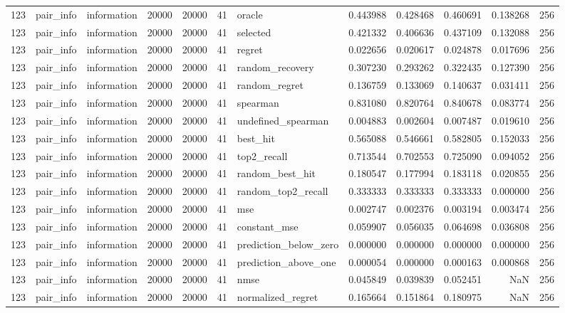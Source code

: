 \begin{tabular}{rllrrrlrrrrr}
123 & pair_info & information & 20000 & 20000 & 41 & oracle & 0.443988 & 0.428468 & 0.460691 & 0.138268 & 256 \\
123 & pair_info & information & 20000 & 20000 & 41 & selected & 0.421332 & 0.406636 & 0.437109 & 0.132088 & 256 \\
123 & pair_info & information & 20000 & 20000 & 41 & regret & 0.022656 & 0.020617 & 0.024878 & 0.017696 & 256 \\
123 & pair_info & information & 20000 & 20000 & 41 & random_recovery & 0.307230 & 0.293262 & 0.322435 & 0.127390 & 256 \\
123 & pair_info & information & 20000 & 20000 & 41 & random_regret & 0.136759 & 0.133069 & 0.140637 & 0.031411 & 256 \\
123 & pair_info & information & 20000 & 20000 & 41 & spearman & 0.831080 & 0.820764 & 0.840678 & 0.083774 & 256 \\
123 & pair_info & information & 20000 & 20000 & 41 & undefined_spearman & 0.004883 & 0.002604 & 0.007487 & 0.019610 & 256 \\
123 & pair_info & information & 20000 & 20000 & 41 & best_hit & 0.565088 & 0.546661 & 0.582805 & 0.152033 & 256 \\
123 & pair_info & information & 20000 & 20000 & 41 & top2_recall & 0.713544 & 0.702553 & 0.725090 & 0.094052 & 256 \\
123 & pair_info & information & 20000 & 20000 & 41 & random_best_hit & 0.180547 & 0.177994 & 0.183118 & 0.020855 & 256 \\
123 & pair_info & information & 20000 & 20000 & 41 & random_top2_recall & 0.333333 & 0.333333 & 0.333333 & 0.000000 & 256 \\
123 & pair_info & information & 20000 & 20000 & 41 & mse & 0.002747 & 0.002376 & 0.003194 & 0.003474 & 256 \\
123 & pair_info & information & 20000 & 20000 & 41 & constant_mse & 0.059907 & 0.056035 & 0.064698 & 0.036808 & 256 \\
123 & pair_info & information & 20000 & 20000 & 41 & prediction_below_zero & 0.000000 & 0.000000 & 0.000000 & 0.000000 & 256 \\
123 & pair_info & information & 20000 & 20000 & 41 & prediction_above_one & 0.000054 & 0.000000 & 0.000163 & 0.000868 & 256 \\
123 & pair_info & information & 20000 & 20000 & 41 & nmse & 0.045849 & 0.039839 & 0.052451 & NaN & 256 \\
123 & pair_info & information & 20000 & 20000 & 41 & normalized_regret & 0.165664 & 0.151864 & 0.180975 & NaN & 256 \\

\end{tabular}
